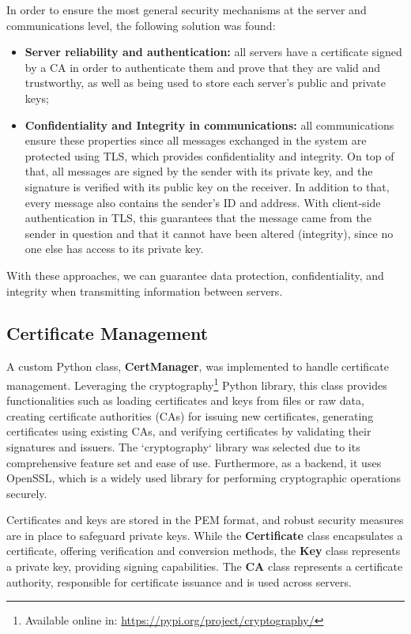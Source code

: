 \documentclass[10pt]{article}
\begin{document}
In order to ensure the most general security mechanisms at the server and communications level, the following solution was found:
\begin{itemize}
    \item \textbf{Server reliability and authentication:} all servers have a certificate signed by a CA in order to authenticate them and prove that they are valid and trustworthy, as well as being used to store each server's public and private keys;
    \item \textbf{Confidentiality and Integrity in communications:} all communications ensure these properties since all messages exchanged in the system are protected using TLS, which provides confidentiality and integrity. On top of that, all messages are signed by the sender with its private key, and the signature is verified with its public key on the receiver. In addition to that, every message also contains the sender's ID and address. With client-side authentication in TLS, this guarantees that the message came from the sender in question and that it cannot have been altered (integrity), since no one else has access to its private key.
\end{itemize}

With these approaches, we can guarantee data protection, confidentiality, and integrity when transmitting information between servers.

\subsection{Certificate Management}

A custom Python class, \textbf{CertManager}, was implemented to handle certificate management. Leveraging the cryptography\footnote{Available online in: \url{https://pypi.org/project/cryptography/}} Python library, this class provides functionalities such as loading certificates and keys from files or raw data, creating certificate authorities (CAs) for issuing new certificates, generating certificates using existing CAs, and verifying certificates by validating their signatures and issuers. The `cryptography` library was selected due to its comprehensive feature set and ease of use. Furthermore, as a backend, it uses OpenSSL, which is a widely used library for performing cryptographic operations securely.

Certificates and keys are stored in the PEM format, and robust security measures are in place to safeguard private keys. While the \textbf{Certificate} class encapsulates a certificate, offering verification and conversion methods, the \textbf{Key} class represents a private key, providing signing capabilities. The \textbf{CA} class represents a certificate authority, responsible for certificate issuance and is used across servers.
\end{document}
